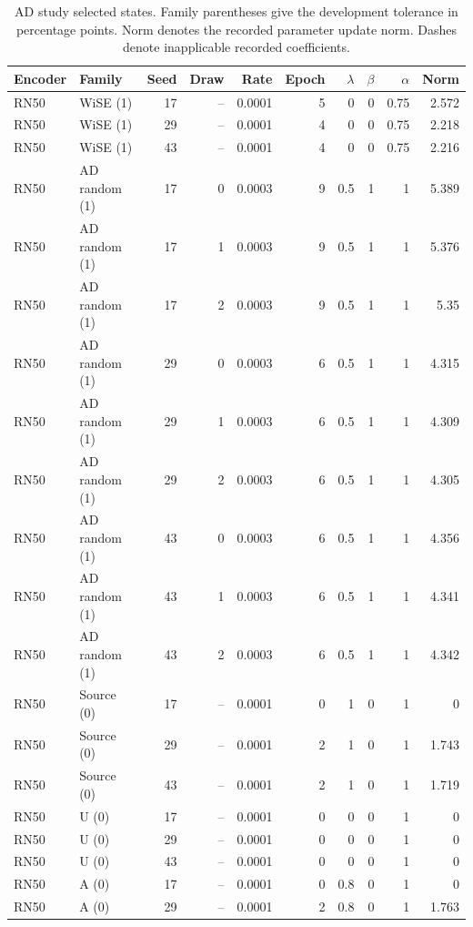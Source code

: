 \begin{table}[t]
\centering
\scriptsize
\setlength{\tabcolsep}{3pt}
\begin{tabular}{llrrrrrrrr}
\toprule
Encoder & Family & Seed & Draw & Rate & Epoch & $\lambda$ & $\beta$ & $\alpha$ & Norm\\
\midrule
RN50 & WiSE (1) & 17 & -- & 0.0001 & 5 & 0 & 0 & 0.75 & 2.572\\
RN50 & WiSE (1) & 29 & -- & 0.0001 & 4 & 0 & 0 & 0.75 & 2.218\\
RN50 & WiSE (1) & 43 & -- & 0.0001 & 4 & 0 & 0 & 0.75 & 2.216\\
RN50 & AD random (1) & 17 & 0 & 0.0003 & 9 & 0.5 & 1 & 1 & 5.389\\
RN50 & AD random (1) & 17 & 1 & 0.0003 & 9 & 0.5 & 1 & 1 & 5.376\\
RN50 & AD random (1) & 17 & 2 & 0.0003 & 9 & 0.5 & 1 & 1 & 5.35\\
RN50 & AD random (1) & 29 & 0 & 0.0003 & 6 & 0.5 & 1 & 1 & 4.315\\
RN50 & AD random (1) & 29 & 1 & 0.0003 & 6 & 0.5 & 1 & 1 & 4.309\\
RN50 & AD random (1) & 29 & 2 & 0.0003 & 6 & 0.5 & 1 & 1 & 4.305\\
RN50 & AD random (1) & 43 & 0 & 0.0003 & 6 & 0.5 & 1 & 1 & 4.356\\
RN50 & AD random (1) & 43 & 1 & 0.0003 & 6 & 0.5 & 1 & 1 & 4.341\\
RN50 & AD random (1) & 43 & 2 & 0.0003 & 6 & 0.5 & 1 & 1 & 4.342\\
RN50 & Source (0) & 17 & -- & 0.0001 & 0 & 1 & 0 & 1 & 0\\
RN50 & Source (0) & 29 & -- & 0.0001 & 2 & 1 & 0 & 1 & 1.743\\
RN50 & Source (0) & 43 & -- & 0.0001 & 2 & 1 & 0 & 1 & 1.719\\
RN50 & U (0) & 17 & -- & 0.0001 & 0 & 0 & 0 & 1 & 0\\
RN50 & U (0) & 29 & -- & 0.0001 & 0 & 0 & 0 & 1 & 0\\
RN50 & U (0) & 43 & -- & 0.0001 & 0 & 0 & 0 & 1 & 0\\
RN50 & A (0) & 17 & -- & 0.0001 & 0 & 0.8 & 0 & 1 & 0\\
RN50 & A (0) & 29 & -- & 0.0001 & 2 & 0.8 & 0 & 1 & 1.763\\
\bottomrule
\end{tabular}
\caption{AD study selected states. Family parentheses give the development tolerance in percentage points. Norm denotes the recorded parameter update norm. Dashes denote inapplicable recorded coefficients.}\label{tab:adselected60}
\end{table}


